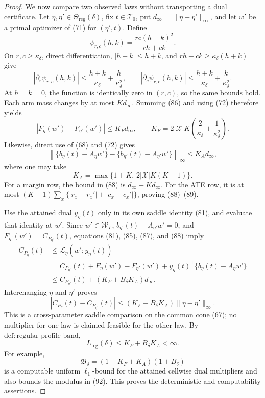 \documentclass{article}
\begin{document}
\begin{proof}
We now compare two observed laws without transporting a dual certificate.  Let \(\eta,\eta'\in\Theta_{\mathrm{reg}}(\delta)\), fix \(t\in\mathcal T_0\), put \(d_\infty=\|\eta-\eta'\|_\infty\), and let \(w'\) be a primal optimizer of (71) for \((\eta',t)\).  Define
\[
\psi_{r,c}(h,k)=\frac{rc(h-k)^2}{rh+ck}.
\]
On \(r,c\geq\kappa_\delta\), direct differentiation, \(|h-k|\leq h+k\), and \(rh+ck\geq\kappa_\delta(h+k)\) give
\[
|\partial_r\psi_{r,c}(h,k)|
\leq\frac{h+k}{\kappa_\delta}+\frac{h}{\kappa_\delta^2},
\qquad
|\partial_c\psi_{r,c}(h,k)|
\leq\frac{h+k}{\kappa_\delta}+\frac{k}{\kappa_\delta^2}.
\tag{86}
\]
At \(h=k=0\), the function is identically zero in \((r,c)\), so the same bounds hold.  Each arm mass changes by at most \(Kd_\infty\).  Summing (86) and using (72) therefore yields
\[
|F_\eta(w')-F_{\eta'}(w')|
\leq K_Fd_\infty,
\qquad
K_F=2|\mathcal X|K
\left(\frac{2}{\kappa_\delta}+\frac{1}{\kappa_\delta^2}\right).
\tag{87}
\]
Likewise, direct use of (68) and (72) gives
\[
\left\|
\{b_\eta(t)-A_\eta w'\}
-\{b_{\eta'}(t)-A_{\eta'}w'\}
\right\|_\infty
\leq K_A d_\infty,
\tag{88}
\]
where one may take
\[
K_A=\max\{1+K,\,2|\mathcal X|K(K-1)\}.
\tag{89}
\]
For a margin row, the bound in (88) is \(d_\infty+Kd_\infty\).  For the ATE row, it is at most \((K-1)\sum_x\{|r_x-r_x'|+|c_x-c_x'|\}\), proving (88)--(89).

Use the attained dual \(y_\eta(t)\) only in its own saddle identity (81), and evaluate that identity at \(w'\).  Since \(w'\in\mathcal W_\Gamma\), \(b_{\eta'}(t)-A_{\eta'}w'=0\), and \(F_{\eta'}(w')=C_{P_{\eta'}}(t)\), equations (81), (85), (87), and (88) imply
\[
\begin{aligned}
C_{P_\eta}(t)
&\leq\mathcal L_\eta(w';y_\eta(t))\\
&=C_{P_{\eta'}}(t)
+F_\eta(w')-F_{\eta'}(w')
+y_\eta(t)^{\mathsf T}\{b_\eta(t)-A_\eta w'\}\\
&\leq C_{P_{\eta'}}(t)
+(K_F+B_\delta K_A)d_\infty.
\end{aligned}
\tag{90}
\]
Interchanging \(\eta\) and \(\eta'\) proves
\[
|C_{P_\eta}(t)-C_{P_{\eta'}}(t)|
\leq(K_F+B_\delta K_A)\|\eta-\eta'\|_\infty.
\tag{91}
\]
This is a cross-parameter saddle comparison on the common cone (67); no multiplier for one law is claimed feasible for the other law.  By \(\mathrm{def{:}regular\mbox{-}profile\mbox{-}band}\),
\[
L_{\mathrm{reg}}(\delta)
\leq K_F+B_\delta K_A<\infty.
\tag{92}
\]
For example,
\[
\mathfrak B_\delta=(1+K_F+K_A)(1+B_\delta)
\tag{93}
\]
is a computable uniform \(\ell_1\)-bound for the attained cellwise dual multipliers and also bounds the modulus in (92).  This proves the deterministic and computability assertions.


\end{proof}
\end{document}
